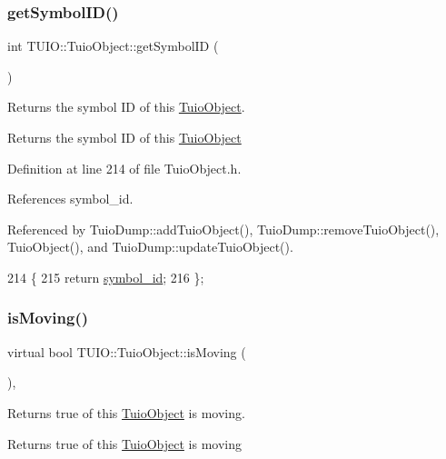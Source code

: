 \subsubsection{\texorpdfstring{get\+Symbol\+I\+D()}{getSymbolID()}}
{\footnotesize\ttfamily int T\+U\+I\+O\+::\+Tuio\+Object\+::get\+Symbol\+ID (\begin{DoxyParamCaption}{ }\end{DoxyParamCaption})\hspace{0.3cm}{\ttfamily [inline]}}

Returns the symbol ID of this \hyperlink{class_t_u_i_o_1_1_tuio_object}{Tuio\+Object}. \begin{DoxyReturn}{Returns}
the symbol ID of this \hyperlink{class_t_u_i_o_1_1_tuio_object}{Tuio\+Object} 
\end{DoxyReturn}


Definition at line 214 of file Tuio\+Object.\+h.



References symbol\+\_\+id.



Referenced by Tuio\+Dump\+::add\+Tuio\+Object(), Tuio\+Dump\+::remove\+Tuio\+Object(), Tuio\+Object(), and Tuio\+Dump\+::update\+Tuio\+Object().


\begin{DoxyCode}
214                           \{ 
215             \textcolor{keywordflow}{return} \hyperlink{class_t_u_i_o_1_1_tuio_object_a05c245f10efaa7bf97b6c383004d6b7f}{symbol\_id};
216         \};
\end{DoxyCode}
\mbox{\label{class_t_u_i_o_1_1_tuio_object_a9239541cb79607ed7a08b2c924655a7b}} 
\subsubsection{\texorpdfstring{is\+Moving()}{isMoving()}}
{\footnotesize\ttfamily virtual bool T\+U\+I\+O\+::\+Tuio\+Object\+::is\+Moving (\begin{DoxyParamCaption}{ }\end{DoxyParamCaption})\hspace{0.3cm}{\ttfamily [inline]}, {\ttfamily [virtual]}}

Returns true of this \hyperlink{class_t_u_i_o_1_1_tuio_object}{Tuio\+Object} is moving. \begin{DoxyReturn}{Returns}
true of this \hyperlink{class_t_u_i_o_1_1_tuio_object}{Tuio\+Object} is moving 
\end{DoxyReturn}


